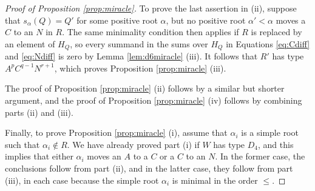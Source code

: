 \documentclass[11pt]{amsart}
\theoremstyle{plain}
\theoremstyle{definition}
\theoremstyle{remark}
\numberwithin{equation}{subsection}
\newcommand{\al}{\alpha}
\begin{document}
\begin{proof}[Proof of Proposition \ref{prop:miracle}]
To prove the last assertion in (ii), suppose that $s_\al(Q)=Q'$ for some
positive root $\al$, but no positive root $\al' < \al$ moves a $C$ to an $N$ in
$R$. The same minimality condition then applies if $R$ is replaced by an element
of $H_Q$, so every summand in the sums over $H_Q$ in Equations \eqref{eq:Cdiff}
and \eqref{eq:Ndiff} is zero by Lemma \ref{lem:d6miracle} (iii). It follows that
$R'$ has type $A^pC^{q-1}N^{r+1}$, which proves Proposition \ref{prop:miracle}
(iii).

The proof of Proposition \ref{prop:miracle} (ii) follows by a similar but
shorter argument, and the proof of Proposition \ref{prop:miracle} (iv) follows
by combining parts (ii) and (iii).

Finally, to prove Proposition \ref{prop:miracle} (i), assume that $\al_i$ is a
simple root such that $\al_i \not\in R$.  We have already proved part (i) if $W$
has type $D_4$, and this implies that either $\al_i$ moves an $A$ to a $C$ or a
$C$ to an $N$. In the former case, the conclusions follow from part (ii), and in
the latter case, they follow from part (iii), in each case because the simple
root $\al_i$ is minimal in the order $\le$.
\end{proof}
\end{document}
